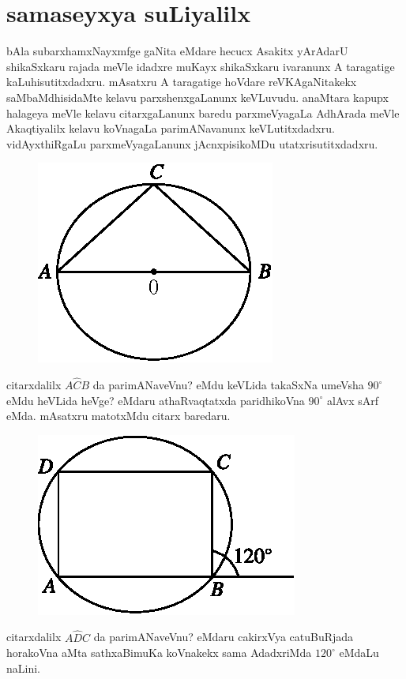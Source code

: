 \chapter{samaseyxya suLiyalilx}

bAla subarxhamxNayxmfge gaNita eMdare hecucx Asakitx yArAdarU shikaSxkaru rajada meVle idadxre muKayx shikaSxkaru ivaranunx A taragatige kaLuhisutitxdadxru. mAsatxru A taragatige hoVdare reVKAgaNitakekx saMbaMdhisidaMte kelavu parxshenxgaLanunx keVLuvudu. anaMtara kapupx halageya meVle kelavu citarxgaLanunx baredu parxmeVyagaLa AdhArada meVle Akaqtiyalilx kelavu koVnagaLa parimANavanunx keVLutitxdadxru. vidAyxthiRgaLu parxmeVyagaLanunx jAcnxpisikoMDu utatxrisutitxdadxru.
\begin{figure}[H]
\centering
\includegraphics{src/figures/m_179a.eps} 
\end{figure}
citarxdalilx $A\hat{C}B$ da parimANaveVnu? eMdu keVLida takaSxNa umeVsha $90^\circ$ eMdu heVLida heVge? eMdaru athaRvaqtatxda paridhikoVna $90^\circ$ alAvx sArf eMda. mAsatxru matotxMdu citarx baredaru.
\begin{figure}[H]
\centering
\includegraphics{src/figures/m_179b.eps}
\end{figure}
citarxdalilx $A\hat{D}C$ da parimANaveVnu? eMdaru cakirxVya catuBuRjada horakoVna aMta sathxaBimuKa koVnakekx sama AdadxriMda $120^\circ$ eMdaLu naLini.


